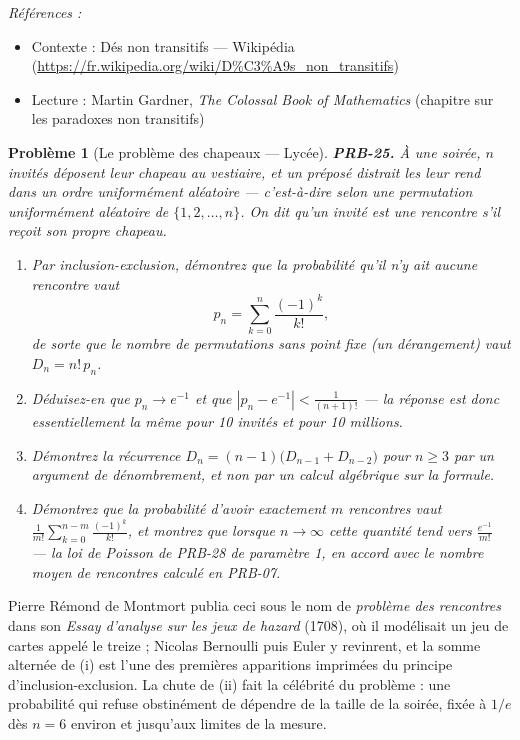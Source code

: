 \documentclass[11pt]{article}
\newtheorem{problem}{Problème}
\newenvironment{refs}{\par\small\noindent\emph{Références :}\begin{itemize}\setlength\itemsep{0pt}}{\end{itemize}\normalsize}
\begin{document}
\begin{refs}
\item Contexte : Dés non transitifs --- Wikipédia (\url{https://fr.wikipedia.org/wiki/D%C3%A9s_non_transitifs})
\item Lecture : Martin Gardner, \textit{The Colossal Book of Mathematics} (chapitre sur les paradoxes non transitifs)
\end{refs}

\bigskip

\begin{problem}[{Le problème des chapeaux --- Lycée}]
\textbf{PRB-25.} À une soirée, $ n $ invités déposent leur chapeau au vestiaire, et un
préposé distrait les leur rend dans un ordre uniformément aléatoire --- c'est-à-dire selon une
permutation uniformément aléatoire de $ \{1, 2, \dots, n\} $. On dit qu'un invité est une
\textit{rencontre} s'il reçoit son propre chapeau.
\begin{enumerate}
\item[(i)] Par inclusion-exclusion, démontrez que la probabilité qu'il n'y ait aucune rencontre vaut
\[ p_n = \sum_{k=0}^{n} \frac{(-1)^k}{k!} , \]
de sorte que le nombre de permutations sans point fixe (un \textit{dérangement}) vaut
$ D_n = n!\, p_n $.
\item[(ii)] Déduisez-en que $ p_n \to e^{-1} $ et que $ |p_n - e^{-1}| < \frac{1}{(n+1)!} $ --- la
réponse est donc essentiellement la même pour 10 invités et pour 10 millions.
\item[(iii)] Démontrez la récurrence $ D_n = (n-1)\big( D_{n-1} + D_{n-2} \big) $ pour $ n \ge 3 $ par
un argument de dénombrement, et non par un calcul algébrique sur la formule.
\item[(iv)] Démontrez que la probabilité d'avoir exactement $ m $ rencontres vaut
$ \frac{1}{m!} \sum_{k=0}^{n-m} \frac{(-1)^k}{k!} $, et montrez que lorsque $ n \to \infty $
cette quantité tend vers $ \frac{e^{-1}}{m!} $ --- la loi de Poisson de PRB-28 de paramètre 1, en
accord avec le nombre moyen de rencontres calculé en PRB-07.
\end{enumerate}

\end{problem}

\noindent Pierre Rémond de Montmort publia ceci sous le nom de \textit{problème des
rencontres} dans son \textit{Essay d'analyse sur les jeux de hazard} (1708), où il modélisait un
jeu de cartes appelé le treize ; Nicolas Bernoulli puis Euler y revinrent, et la somme alternée
de (i) est l'une des premières apparitions imprimées du principe d'inclusion-exclusion. La chute
de (ii) fait la célébrité du problème : une probabilité qui refuse obstinément de dépendre de la
taille de la soirée, fixée à $ 1/e $ dès $ n = 6 $ environ et jusqu'aux limites de la
mesure.
\end{document}
